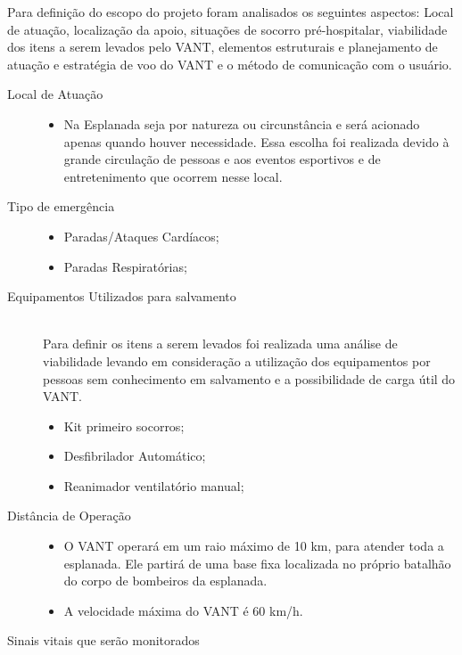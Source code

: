 \label{escopo}
Para definição do escopo do projeto foram analisados os seguintes aspectos: Local de atuação, localização da apoio, situações de socorro pré-hospitalar, viabilidade dos itens a serem levados pelo VANT, elementos estruturais e planejamento de atuação e estratégia de voo do VANT e o método de comunicação com o usuário.
\begin{description}
  \item[Local de Atuação] \hfill 
  	\begin{itemize}
  		\item Na Esplanada seja por natureza ou circunstância e será acionado apenas quando houver necessidade. Essa escolha foi realizada devido à grande circulação de pessoas e aos eventos esportivos e de entretenimento que ocorrem nesse local.

  	\end{itemize}
  \item[Tipo de emergência] \hfill 
  	\begin{itemize}
  		\item Paradas/Ataques Cardíacos;
		\item Paradas Respiratórias;
  	\end{itemize}
  \item[Equipamentos Utilizados para salvamento] \hfill \\
  	Para definir os itens a serem levados foi realizada uma análise de viabilidade levando em consideração a utilização dos equipamentos por pessoas sem conhecimento em salvamento e a possibilidade de carga útil do VANT.
  	\begin{itemize}
  		\item Kit primeiro socorros;
		\item Desfibrilador Automático;
		\item Reanimador ventilatório manual;
  	\end{itemize}
  \item[Distância de Operação] \hfill 
  	\begin{itemize}
	  
	\item O VANT operará em um raio máximo de 10 km, para atender toda a esplanada.
	  \subitem Ele partirá de uma base fixa localizada no próprio batalhão do corpo de bombeiros da esplanada.

	\item A velocidade máxima do VANT é 60 km/h.
	  
  	\end{itemize}
  \item[Sinais vitais que serão monitorados] \hfill 
  	\begin{itemize}
	

\end{itemize}
\end{description}
